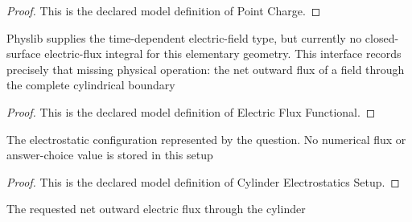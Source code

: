 \begin{proof}
  This is the declared model definition of Point Charge.
\end{proof}
\begin{definition}
  \label{def:physics:phyx-mini-0848:phyxminiproblems-problemphyxmini0848-electricfluxfunctional}
  Physlib supplies the time-dependent electric-field type, but currently no closed-surface electric-flux integral for this elementary geometry. This interface records precisely that missing physical operation: the net outward flux of a field through the complete cylindrical boundary
\end{definition}
\begin{proof}
  This is the declared model definition of Electric Flux Functional.
\end{proof}
\begin{definition}
  \label{def:physics:phyx-mini-0848:phyxminiproblems-problemphyxmini0848-cylinderelectrostaticssetup}
  The electrostatic configuration represented by the question. No numerical flux or answer-choice value is stored in this setup
\end{definition}
\begin{proof}
  This is the declared model definition of Cylinder Electrostatics Setup.
\end{proof}
\begin{definition}
  \label{def:physics:phyx-mini-0848:phyxminiproblems-problemphyxmini0848-netcylinderflux}
  The requested net outward electric flux through the cylinder
\end{definition}
